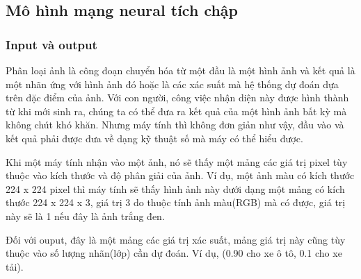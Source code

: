 \subsection{Mô hình mạng neural tích chập}
	\subsubsection{Input và output}
		Phân loại ảnh là công đoạn chuyển hóa từ một đầu là một hình ảnh và kết quả là một nhãn ứng với hình ảnh đó hoặc là các xác suất mà hệ thống dự đoán dựa trên đặc điểm của ảnh. Với con người, công việc nhận diện này được hình thành từ khi mới sinh ra, chúng ta có thể đưa ra kết quả của một hình ảnh bất kỳ mà không chút khó khăn. Nhưng máy tính thì không đơn giản như vậy, đầu vào và kết quả phải được đưa về dạng kỹ thuật số mà máy có thể hiểu được.\par
		Khi một máy tính nhận vào một ảnh, nó sẽ thấy một mảng các giá trị pixel tùy thuộc vào kích thước và độ phân giải của ảnh\cite{overview}. Ví dụ, một ảnh màu có kích thước 224 x 224 pixel thì máy tính sẽ thấy hình ảnh này dưới dạng một mảng có kích thước 224 x 224 x 3, giá trị 3 do thuộc tính ảnh màu(RGB) mà có được, giá trị này sẽ là 1 nếu đây là ảnh trắng đen.\par
		Đối với ouput, đây là một mảng các giá trị xác suất, mảng giá trị này cũng tùy thuộc vào số lượng nhãn(lớp) cần dự đoán. Ví dụ, (0.90 cho xe ô tô, 0.1 cho xe tải).
